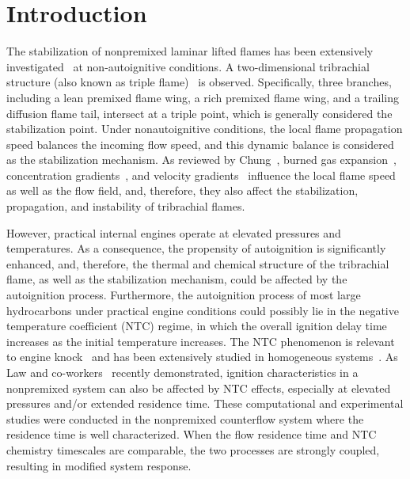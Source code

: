 \documentclass{wssci}
\begin{document}

\section{Introduction}

The stabilization of nonpremixed laminar lifted flames has been extensively investigated~\cite{chung07} at non-autoignitive conditions. A two-dimensional tribrachial structure (also known as triple flame)~\cite{buckmaster02} is observed.  Specifically, three branches, including a lean premixed flame wing, a rich premixed flame wing, and a trailing diffusion flame tail, intersect at a triple point, which is generally considered the stabilization point.  Under nonautoignitive conditions, the local flame propagation speed balances the incoming flow speed, and this dynamic balance is considered as the stabilization mechanism.  As reviewed by Chung~\cite{chung07}, burned gas expansion~\cite{ruetsch95,lee97,plessing98,kioni99}, concentration gradients~\cite{dold89,hartley91,ghosal00}, and velocity gradients~\cite{kim07} influence the local flame speed as well as the flow field, and, therefore, they also affect the stabilization, propagation, and instability of tribrachial flames.

However, practical internal engines operate at elevated pressures and temperatures.  As a consequence, the propensity of autoignition is significantly enhanced, and, therefore, the thermal and chemical structure of the tribrachial flame, as well as the stabilization mechanism, could be affected by the autoignition process.  Furthermore, the autoignition process of most large hydrocarbons under practical engine conditions could possibly lie in the negative temperature coefficient (NTC) regime, in which the overall ignition delay time increases as the initial temperature increases.  The NTC phenomenon is relevant to engine knock~\cite{battin-leclerc08} and has been extensively studied in homogeneous systems~\cite{zador11}.  As Law and co-workers~\cite{law12,zhao13,deng14} recently demonstrated, ignition characteristics in a nonpremixed system can also be affected by NTC effects, especially at elevated pressures and/or extended residence time.  These computational and experimental studies were conducted in the nonpremixed counterflow system where the residence time is well characterized.  When the flow residence time and NTC chemistry timescales are comparable, the two processes are strongly coupled, resulting in modified system response.
\end{document}

